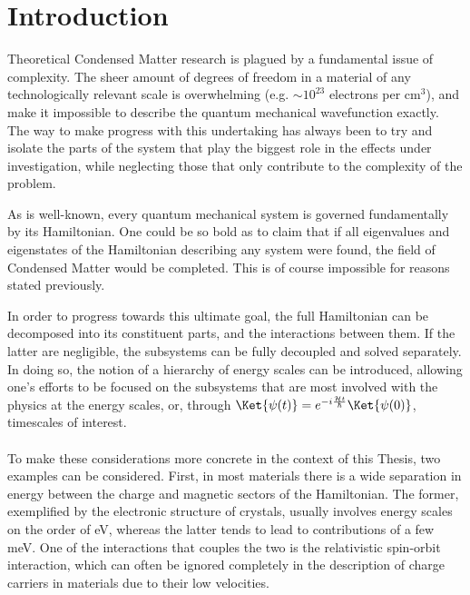 \chapter{Introduction}
Theoretical Condensed Matter research is plagued by a fundamental issue of complexity. The sheer amount of degrees of freedom in a material of any technologically relevant scale is overwhelming (e.g. $\sim10^{23}$ electrons per cm$^3$), and make it impossible to describe the quantum mechanical wavefunction exactly.
The way to make progress with this undertaking has always been to try and isolate the parts of the system that play the biggest role in the effects under investigation, while neglecting those that only contribute to the complexity of the problem.

As is well-known, every quantum mechanical system is governed fundamentally by its Hamiltonian.
One could be so bold as to claim that if all eigenvalues and eigenstates of the Hamiltonian describing any system were found, the field of Condensed Matter would be completed. This is of course impossible for reasons stated previously.

In order to progress towards this ultimate goal, the full Hamiltonian can be decomposed into its constituent parts, and the interactions between them.
If the latter are negligible, the subsystems can be fully decoupled and solved separately. In doing so, the notion of a hierarchy of energy scales can be introduced, allowing one's efforts to be focused on the subsystems that are most involved with the physics at the energy scales, or, through $\Ket{\psi(t)} = e^{-i \frac{\mathcal{H}t}{\hbar}}\Ket{\psi(0)}$, timescales of interest.
\\\\
To make these considerations more concrete in the context of this Thesis, two examples can be considered.
First, in most materials there is a wide separation in energy between the charge and magnetic sectors of the Hamiltonian. The former, exemplified by the electronic structure of crystals, usually involves energy scales on the order of eV, whereas the latter tends to lead to contributions of a few meV.
One of the interactions that couples the two is the relativistic spin-orbit interaction, which can often be ignored completely in the description of charge carriers in materials due to their low velocities.

